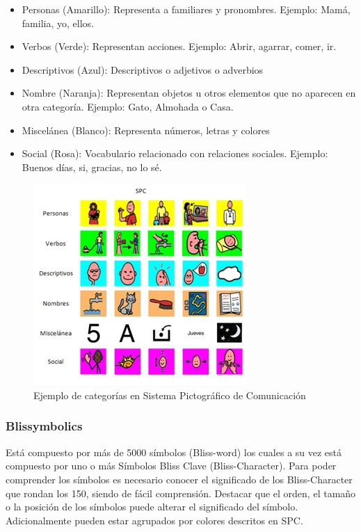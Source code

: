 \begin{itemize}
	\item Personas (Amarillo): Representa a familiares y pronombres. Ejemplo: Mamá, familia,  yo, ellos.
	\item Verbos (Verde): Representan acciones. Ejemplo: Abrir, agarrar, comer, ir.
	\item Descriptivos (Azul): Descriptivos o adjetivos o adverbios
	\item Nombre (Naranja): Representan objetos u otros elementos que no aparecen en otra categoría. Ejemplo: Gato, Almohada o Casa.
	\item Miscelánea (Blanco): Representa números, letras y colores
	\item Social (Rosa): Vocabulario relacionado con relaciones sociales. Ejemplo: Buenos días, si, gracias, no lo sé.
	
\end{itemize}


\begin{figure}[h!]
	\centering
	\includegraphics[width=0.7\linewidth]{Imagenes/Bitmap/SPCcolores}
	\caption{Ejemplo de categorías en Sistema Pictográfico de Comunicación}
	\label{fig:spccolores}
\end{figure}

\subsubsection{Blissymbolics}
Está compuesto por más de 5000 símbolos (Bliss-word) los cuales a su vez está compuesto por uno o más Símbolos Bliss Clave (Bliss-Character). Para poder comprender los símbolos es necesario conocer el significado de los Bliss-Character que rondan los 150, siendo de fácil comprensión. Destacar que el orden, el tamaño o la posición de los símbolos puede alterar el significado del símbolo. Adicionalmente pueden estar agrupados por colores descritos en SPC.



